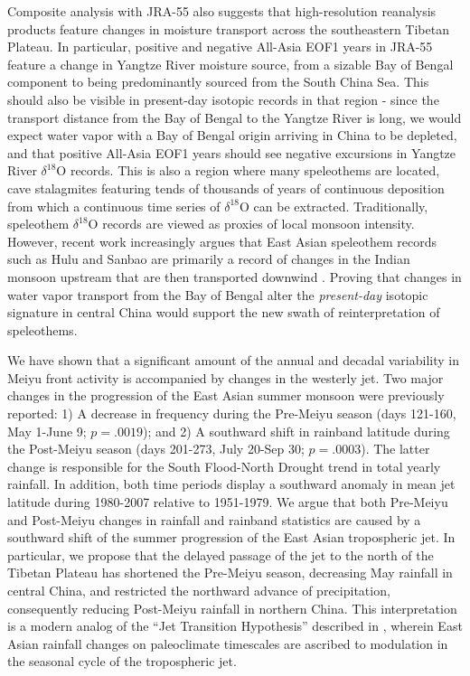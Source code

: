	Composite analysis with JRA-55 also suggests that high-resolution reanalysis products feature changes in moisture transport across the southeastern Tibetan Plateau. In particular, positive and negative All-Asia EOF1 years in JRA-55 feature a change in Yangtze River moisture source, from a sizable Bay of Bengal component to being predominantly sourced from the South China Sea. This should also be visible in present-day isotopic records in that region - since the transport distance from the Bay of Bengal to the Yangtze River is long, we would expect water vapor with a Bay of Bengal origin arriving in China to be depleted, and that positive All-Asia EOF1 years should see negative excursions in Yangtze River $\delta ^{18}$O records. This is also a region where many speleothems are located, cave stalagmites featuring tends of thousands of years of continuous deposition from which a continuous time series of $\delta ^{18}$O can be extracted. Traditionally, speleothem $\delta ^{18}$O records are viewed as proxies of local monsoon intensity. However, recent work increasingly argues that East Asian speleothem records such as Hulu and Sanbao are primarily a record of changes in the Indian monsoon upstream that are then transported downwind \citep{Cai2015,Pausata2011,Baker2015}. Proving that changes in water vapor transport from the Bay of Bengal alter the \textit{present-day} isotopic signature in central China would support the new swath of reinterpretation of speleothems.

	We have shown that a significant amount of the annual and decadal variability in Meiyu front activity is accompanied by changes in the westerly jet. Two major changes in the progression of the East Asian summer monsoon were previously reported: 1) A decrease in frequency during the Pre-Meiyu season (days 121-160, May 1-June 9; $p=.0019$); and 2) A southward shift in rainband latitude during the Post-Meiyu season (days 201-273, July 20-Sep 30; $p=.0003$). The latter change is responsible for the South Flood-North Drought trend in total yearly rainfall. In addition, both time periods display a southward anomaly in mean jet latitude during 1980-2007 relative to 1951-1979. We argue that both Pre-Meiyu and Post-Meiyu changes in rainfall and rainband statistics are caused by a southward shift of the summer progression of the East Asian tropospheric jet. In particular, we propose that the delayed passage of the jet to the north of the Tibetan Plateau has shortened the Pre-Meiyu season, decreasing May rainfall in central China, and restricted the northward advance of precipitation, consequently reducing Post-Meiyu rainfall in northern China. This interpretation is a modern analog of the ``Jet Transition Hypothesis'' described in \citet{Chiang2015}, wherein East Asian rainfall changes on paleoclimate timescales are ascribed to modulation in the seasonal cycle of the tropospheric jet. 	
 
